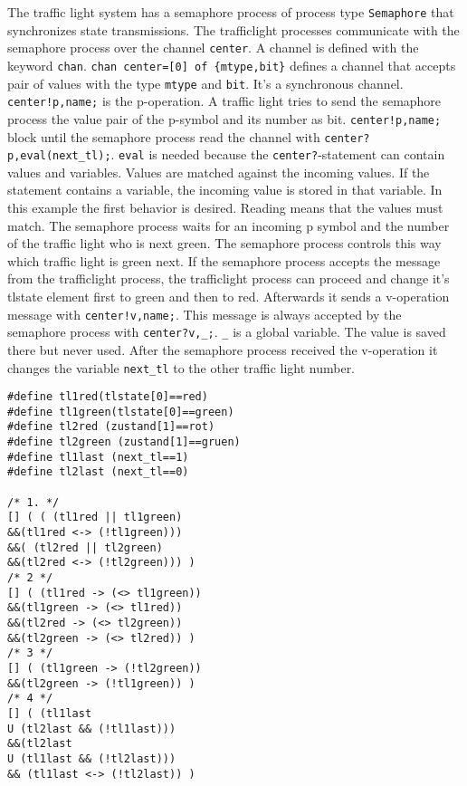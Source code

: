 \documentclass[a4paper, twoside]{article}
\begin{document}
The traffic light system has a semaphore process of process type \texttt{Semaphore} that synchronizes state transmissions.  The trafficlight processes communicate with the semaphore process over the channel \texttt{center}. A channel is defined with the keyword \texttt{chan}. \texttt{chan center=[0] of \{mtype,bit\}} defines a channel that accepts pair of values with the type \texttt{mtype} and \texttt{bit}. It's a synchronous channel.  \texttt{center!p,name;} is the p-operation. A traffic light tries to send the semaphore process the value pair of the p-symbol and its number as bit. \texttt{center!p,name;} block until the semaphore process read the channel with \verb|center?p,eval(next_tl);|. \texttt{eval} is needed because the \texttt{center?}-statement can contain values and variables. Values are matched against the incoming values. If the statement contains a variable, the incoming value is stored in that variable. In this example the first behavior is desired. Reading means that the values must match. The semaphore process waits for an incoming p symbol and the number of the traffic light who is next green. The semaphore process controls this way which traffic light is green next. If the semaphore process accepts the message from the trafficlight process, the trafficlight process can proceed and change it's tlstate element first to green and then to red. Afterwards it sends a v-operation message with \texttt{center!v,name;}. This message is always accepted by the semaphore process with \texttt{center?v,_;}. \texttt{_} is a global variable. The value is saved there but never used. After the semaphore process received the v-operation it changes the variable \texttt{next_tl} to the other traffic light number.

\begin{lstlisting}[label={lst:spinltl},caption={LTL-properties with formalized atomic propositions for spin}]
#define tl1red(tlstate[0]==red)
#define tl1green(tlstate[0]==green)
#define tl2red (zustand[1]==rot)
#define tl2green (zustand[1]==gruen)
#define tl1last (next_tl==1)
#define tl2last (next_tl==0)

/* 1. */
[] ( ( (tl1red || tl1green)
&&(tl1red <-> (!tl1green)))
&&( (tl2red || tl2green)
&&(tl2red <-> (!tl2green))) )
/* 2 */
[] ( (tl1red -> (<> tl1green))
&&(tl1green -> (<> tl1red))
&&(tl2red -> (<> tl2green))
&&(tl2green -> (<> tl2red)) )
/* 3 */
[] ( (tl1green -> (!tl2green))
&&(tl2green -> (!tl1green)) )
/* 4 */
[] ( (tl1last
U (tl2last && (!tl1last)))
&&(tl2last
U (tl1last && (!tl2last)))
&& (tl1last <-> (!tl2last)) )
\end{lstlisting}
\end{document}
